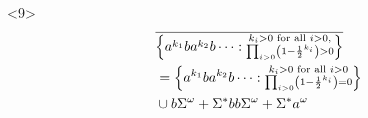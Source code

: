 \documentclass{beamer}
\begin{document}
\begin{frame}
\begin{columns}
\begin{column}{0.5\textwidth}
\begin{overlayarea}{\textwidth}{\textheight}
\begin{onlyenv}
            \vfill
            \begin{uncoverenv}<9>
              \begin{align*}
                &\overline{\left\{
                  a^{k_{1}}ba^{k_{2}}b\dots:
                  \substack{k_{i}>0\text{ for all }i>0,\\
                  \prod_{i>0}\left(1-\frac{1}{2}^{k_{i}}\right) > 0}
                \right\}}\\
                &= \left\{
                  a^{k_{1}}ba^{k_{2}}b\dots:
                  \substack{k_{i}>0\text{ for all }i>0\\
                  \prod_{i>0}\left(1-\frac{1}{2}^{k_{i}}\right) = 0}
                \right\}\\
                &\cup b\Sigma^{\omega} + \Sigma^{*}bb\Sigma^{\omega}
                + \Sigma^{*}a^{\omega}\\
              \end{align*}
            \end{uncoverenv}
          \end{onlyenv}
        \end{overlayarea}
      \end{column}
    \end{columns}
  \end{frame}
\end{document}
